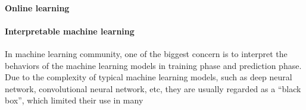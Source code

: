 \paragraph{Online learning}

\paragraph{Interpretable machine learning} In machine learning community, one of the biggest concern is to interpret the behaviors of the machine learning models in training phase and prediction phase. Due to the complexity of typical machine learning models, such as deep neural network, convolutional neural network, etc, they are usually regarded as a ``black box'', which limited their use in many 


